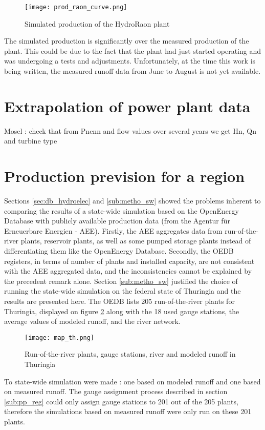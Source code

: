 \begin{figure}[H]
\centering
\texttt{[image: prod\_raon\_curve.png]}
\caption{Simulated production of the HydroRaon plant}
\label{prod_raon_curve}
\end{figure}

The simulated production is significantly over the measured production of the plant. This could be due to the fact that the plant had just started operating and was undergoing a tests and adjustments. Unfortunately, at the time this work is being written, the measured runoff data from June to August is not yet available.

\section{Extrapolation of power plant data}
\label{missing_data}
Mosel : check that from Pnenn and flow values over several years we get Hn, Qn and turbine type

\section{Production prevision for a region}
\label{sec:res_th}

Sections \ref{sec:db_hydroelec} and \ref{sub:metho_sw} showed the problems inherent to comparing the results of a state-wide simulation based on the OpenEnergy Database with publicly available production data (from the Agentur für Erneuerbare Energien - AEE). Firstly, the AEE aggregates data from run-of-the-river plants, reservoir plants, as well as some pumped storage plants instead of differentiating them like the OpenEnergy Database. Secondly, the OEDB registers, in terms of number of plants and installed capacity, are not consistent with the AEE aggregated data, and the inconsistencies cannot be explained by the precedent remark alone. \newline
Section \ref{sub:metho_sw} justified the choice of running the state-wide simulation on the federal state of Thuringia and the results are presented here. \newline
The OEDB lists 205 run-of-the-river plants for Thuringia, displayed on figure \ref{map_th} along with the 18 used gauge stations, the average values of modeled runoff, and the river network.

\begin{figure}[H]
\centering
\texttt{[image: map\_th.png]}
\caption{Run-of-the-river plants, gauge stations, river and modeled runoff in Thuringia}
\label{map_th}
\end{figure}

To state-wide simulation were made : one based on modeled runoff and one based on measured runoff. The gauge assignment process described in section \ref{sub:pp_reg} could only assign gauge stations to 201 out of the 205 plants, therefore the simulations based on measured runoff were only run on these 201 plants.
